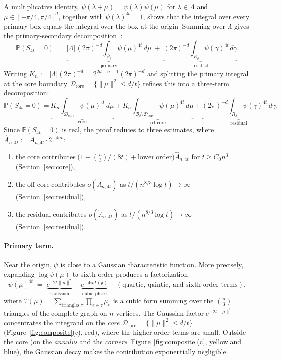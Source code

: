 \documentclass[11pt]{article}
\theoremstyle{definition}
\newcommand{\Prb}{\mathbb{P}}
\newcommand{\Bbox}{\mathcal{B}}
\newcommand{\corereg}{\mathcal{D}_\mathrm{core}}
\newcommand{\Ahat}{\hat A_{n,4t}}
\begin{document}
A multiplicative identity, \(\psi(\lambda+\mu)=\psi(\lambda)\psi(\mu)\) for $\lambda \in \Lambda$ and \(\mu\in[-\pi/4,\pi/4]^d\), together with \(\psi(\lambda)^{4t}=1\), shows that the integral over every primary box equals the integral over the box at the origin. Summing over \(\Lambda\) gives the primary-secondary decomposition~\cite[Proposition~2.1]{DL10}:
\begin{equation}\label{eq:primary-secondary}
  \Prb(S_{4t}=0)
  \;=\;
  \underbrace{|\Lambda|\,(2\pi)^{-d}\int_{\Bbox_\delta}\psi(\mu)^{4t}\,d\mu}_{\text{primary}}
  \;+\;
  \underbrace{(2\pi)^{-d}\int_{R_\delta}\psi(\gamma)^{4t}\,d\gamma}_{\text{residual}}.
\end{equation}
Writing \(K_n:=|\Lambda|(2\pi)^{-d}=2^{2d-n+1}(2\pi)^{-d}\) and splitting the primary integral at the core boundary \(\corereg=\{\|\mu\|^2\le d/t\}\) refines this into a three-term decomposition:
\begin{equation}\label{eq:three-way}
  \Prb(S_{4t}=0)
  =
  \underbrace{K_n\!\int_{\corereg}\psi(\mu)^{4t}\,d\mu}_{\text{core}}
  +\underbrace{K_n\!\int_{\Bbox_\delta\setminus\corereg}\psi(\mu)^{4t}\,d\mu}_{\text{off-core}}
  +\underbrace{(2\pi)^{-d}\!\int_{R_\delta}\psi(\gamma)^{4t}\,d\gamma}_{\text{residual}}.
\end{equation}
Since \(\Prb(S_{4t}=0)\) is real, the proof reduces to three estimates, where \(\Ahat:=A_{n,4t}\cdot 2^{-4nt}\):
\begin{enumerate}[label=(\roman*),nosep]
\item the core contributes \(\bigl(1-\binom{n}{3}/(8t)+\text{lower order}\bigr)\Ahat\) for \(t\ge C_0 n^3\) \hfill(Section~\ref{sec:core}),
\item the off-core contributes \(o(\Ahat)\) as \(t/(n^{8/3}\log t)\to\infty\) \hfill(Section~\ref{sec:residual}),
\item the residual contributes \(o(\Ahat)\) as \(t/(n^{8/3}\log t)\to\infty\) \hfill(Section~\ref{sec:residual}).
\end{enumerate}

\paragraph{Primary term.}
Near the origin, \(\psi\) is close to a Gaussian characteristic function. More precisely, expanding \(\log\psi(\mu)\) to sixth order produces a factorization
\[
  \psi(\mu)^{4t}
  \;=\;
  \underbrace{e^{-2t\|\mu\|^2}}_{\text{Gaussian}}
  \;\cdot\;
  \underbrace{e^{-4itT(\mu)}}_{\text{cubic phase}}
  \;\cdot\;
  (\text{quartic, quintic, and sixth-order terms}),
\]
where \(T(\mu)=\sum_{\text{triangles }\tau}\prod_{e\in\tau}\mu_e\) is a cubic form summing over the \(\binom{n}{3}\) triangles of the complete graph on \(n\) vertices. The Gaussian factor \(e^{-2t\|\mu\|^2}\) concentrates the integrand on the \emph{core} \(\corereg=\{\|\mu\|^2\le d/t\}\) (Figure~\ref{fig:composite}(c), red), where the higher-order terms are small. Outside the core (on the \emph{annulus} and the \emph{corners}, Figure~\ref{fig:composite}(c), yellow and blue), the Gaussian decay makes the contribution exponentially negligible.
\end{document}
